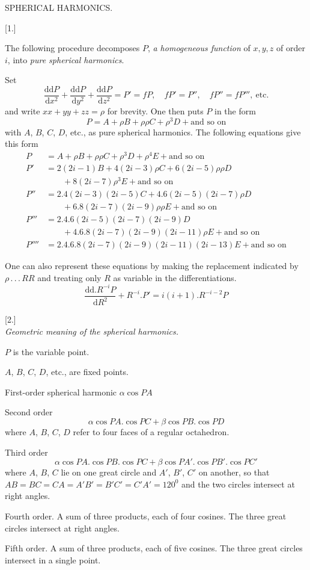 \begin{center}SPHERICAL HARMONICS.\end{center}
\begin{center}[1.]\end{center}
The following procedure decomposes $P$, \textit{a homogeneous function} of $x,y,z$ of order $i$, into \textit{pure spherical harmonics}.

Set
\[
\frac{\mathrm d\mathrm dP}{\mathrm dx^2}+\frac{\mathrm d\mathrm dP}{\mathrm dy^2}+\frac{\mathrm d\mathrm dP}{\mathrm dz^2}=P'=fP,\quad fP'=P'',\quad fP''=fP''',\ \text{etc.}
\]
and write $xx+yy+zz=\rho$ for brevity. One then puts $P$ in the form
\[
P=A+\rho B+\rho\rho C+\rho^3D+\text{and so on}
\]
with $A$, $B$, $C$, $D$, etc., as pure spherical harmonics. The following equations give this form
\[
\begin{aligned}
P&=A+\rho B+\rho\rho C+\rho^3D+\rho^4E+\text{and so on}\\
P'&=2(2i-1)B+4(2i-3)\rho C+6(2i-5)\rho\rho D\\
&\qquad+8(2i-7)\rho^3E+\text{and so on}\\
P''&=2.4(2i-3)(2i-5)C+4.6(2i-5)(2i-7)\rho D\\
&\qquad+6.8(2i-7)(2i-9)\rho\rho E+\text{and so on}\\
P'''&=2.4.6(2i-5)(2i-7)(2i-9)D\\
&\qquad+4.6.8(2i-7)(2i-9)(2i-11)\rho E+\text{and so on}\\
P''''&=2.4.6.8(2i-7)(2i-9)(2i-11)(2i-13)E+\text{and so on}
\end{aligned}
\]

One can also represent these equations by making the replacement indicated by $\rho\, .\, .\, .\,RR$ and treating only $R$ as variable in the differentiations.
\[
\frac{\mathrm d\mathrm d.R^{-i}P}{\mathrm dR^2}+R^{-i}.P'=i(i+1).R^{-i-2}P
\]

\begin{center}[2.]\\\textit{Geometric meaning of the spherical harmonics.}\end{center}
$P$ is the variable point.

$A$, $B$, $C$, $D$, etc., are fixed points.

First-order spherical harmonic $\alpha\cos PA$

Second order
\[
\alpha\cos PA.\cos PC+\beta\cos PB.\cos PD
\]
where $A$, $B$, $C$, $D$ refer to four faces of a regular octahedron.
\begin{center}\end{center}
Third order
\[
\alpha\cos PA.\cos PB.\cos PC+\beta\cos PA'.\cos PB'.\cos PC'
\]
where $A$, $B$, $C$ lie on one great circle and $A'$, $B'$, $C'$ on another, so that $AB=BC=CA=A'B'=B'C'=C'A'=120^0$ and the two circles intersect at right angles.

Fourth order. A sum of three products, each of four cosines. The three great circles intersect at right angles.

Fifth order. A sum of three products, each of five cosines. The three great circles intersect in a single point.

